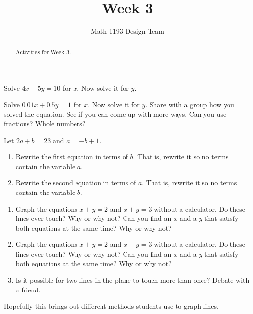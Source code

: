 \documentclass[noauthor]{ximera}
\title{Week 3}
\author{Math 1193 Design Team}
\begin{document}
\begin{abstract}
    Activities for Week 3.
\end{abstract}
\maketitle

\begin{problem}
Solve \(4x - 5y = 10\) for \(x\). Now solve it for \(y\).
\end{problem}

\begin{problem}
Solve \(0.01x + 0.5y = 1\) for \(x\). Now solve it for \(y\).
Share with a group how you solved the equation. See if you can come up with more ways. Can you use fractions? Whole numbers?
\end{problem}

\begin{problem}
Let \(2a + b = 23\) and \(a = -b + 1\). 
\begin{enumerate}
    \item Rewrite the first equation in terms of \(b\). That is, rewrite it so no terms contain the variable \(a\).
    \item Rewrite the second equation in terms of \(a\). That is, rewrite it so no terms contain the variable \(b\).
\end{enumerate}
\end{problem}

\begin{problem}
\begin{enumerate}
    \item Graph the equations \(x + y = 2\) and \(x + y = 3\)
    without a calculator. Do these lines ever touch? Why or why not?
    Can you find an \(x\) and a \(y\) that satisfy both equations at 
    the same time? Why or why not? 
    \item Graph the equations \(x + y = 2\) and \(x - y = 3\)
    without a calculator. Do these lines ever touch? Why or why not?
    Can you find an \(x\) and a \(y\) that satisfy both equations at 
    the same time? Why or why not? 
    \item Is it possible for two lines in the 
    plane to touch more than once? Debate with a friend.
\end{enumerate}

\begin{instructorNotes}
Hopefully this brings out different methods students use to graph lines.
\end{instructorNotes}
\end{problem}
\end{document}
